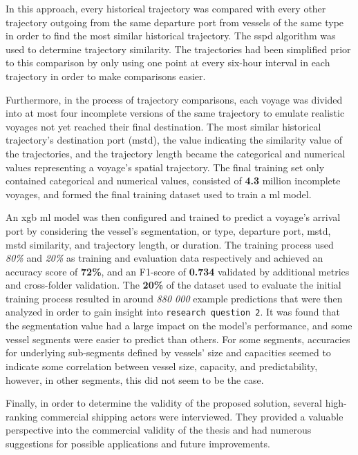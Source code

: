 In this approach, every historical trajectory was compared with every other trajectory outgoing from the same departure port from vessels of the same type in order to find the most similar historical trajectory. The \acrfull{sspd} algorithm was used to determine trajectory similarity. The trajectories had been simplified prior to this comparison by only using one point at every six-hour interval in each trajectory in order to make comparisons easier.

Furthermore, in the process of trajectory comparisons, each voyage was divided into at most four incomplete versions of the same trajectory to emulate realistic voyages not yet reached their final destination. The most similar historical trajectory's destination port (\acrshort{mstd}), the value indicating the similarity value of the trajectories, and the trajectory length became the categorical and numerical values representing a voyage's spatial trajectory. The final training set only contained categorical and numerical values, consisted of \textbf{4.3} million incomplete voyages, and formed the final training dataset used to train a \acrshort{ml} model.

An \acrfull{xgb} \acrshort{ml} model was then configured and trained to predict a voyage's arrival port by considering the vessel's segmentation, or type, departure port, \acrshort{mstd}, \acrshort{mstd} similarity, and trajectory length, or duration. The training process used \textit{80\%} and \textit{20\%} as training and evaluation data respectively and achieved an accuracy score of \textbf{72\%}, and an F1-score of \textbf{0.734} validated by additional metrics and cross-folder validation. The \textbf{20\%} of the dataset used to evaluate the initial training process resulted in around \textit{880 000} example predictions that were then analyzed in order to gain insight into \texttt{research question 2}. It was found that the segmentation value had a large impact on the model's performance, and some vessel segments were easier to predict than others. For some segments, accuracies for underlying sub-segments defined by vessels' size and capacities seemed to indicate some correlation between vessel size, capacity, and predictability, however, in other segments, this did not seem to be the case.

Finally, in order to determine the validity of the proposed solution, several high-ranking commercial shipping actors were interviewed. They provided a valuable perspective into the commercial validity of the thesis and had numerous suggestions for possible applications and future improvements.

